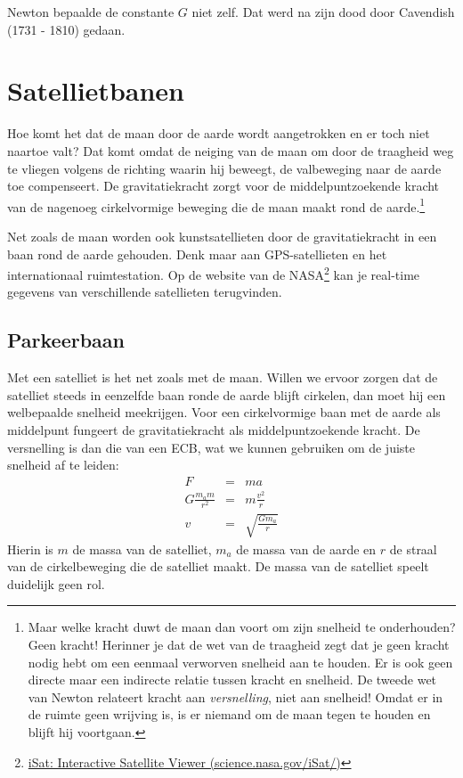 Newton bepaalde de constante $G$ niet zelf. Dat werd na zijn dood door Cavendish (1731 - 1810) gedaan.

\newpage

\section{Satellietbanen}

Hoe komt het dat de maan door de aarde wordt aangetrokken en er toch niet naartoe valt? Dat komt omdat de neiging van de maan om door de traagheid weg te vliegen volgens de richting waarin hij beweegt, de valbeweging naar de aarde toe compenseert. De gravitatiekracht zorgt voor de middelpuntzoekende kracht van de nagenoeg cirkelvormige beweging die de maan maakt rond de aarde.\footnote{Maar welke kracht duwt de maan dan voort om zijn snelheid te onderhouden? Geen kracht! Herinner je dat de wet van de traagheid zegt dat je geen kracht nodig hebt om een eenmaal verworven snelheid aan te houden. Er is ook geen directe maar een indirecte relatie tussen kracht en snelheid. De tweede wet van Newton relateert kracht aan \textit{versnelling}, niet aan snelheid! Omdat er in de ruimte geen wrijving is, is er niemand om de maan tegen te houden en blijft hij voortgaan.}

Net zoals de maan worden ook kunstsatellieten door de gravitatiekracht in een baan rond de aarde gehouden. Denk maar aan GPS-satellieten en het internationaal ruimtestation. Op de website van de NASA\footnote{\href{http://science.nasa.gov/iSat/}{iSat: Interactive Satellite Viewer (science.nasa.gov/iSat/)}} kan je real-time gegevens van verschillende satellieten terugvinden.

\subsection{Parkeerbaan}

Met een satelliet is het net zoals met de maan. Willen we ervoor zorgen dat de satelliet steeds in eenzelfde baan ronde de aarde blijft cirkelen, dan moet hij een welbepaalde snelheid meekrijgen. Voor een cirkelvormige baan met de aarde als middelpunt fungeert de gravitatiekracht als middelpuntzoekende kracht. De versnelling is dan die van een ECB, wat we kunnen gebruiken om de juiste snelheid af te leiden:
\begin{eqnarray*}
F&=&ma\\
G\frac{m_am}{r^2}&=&m\frac{v^2}{r}\\
v&=&\sqrt{\frac{Gm_a}{r}}
\end{eqnarray*}
Hierin is $m$ de massa van de satelliet, $m_a$ de massa van de aarde en $r$ de straal van de cirkelbeweging die de satelliet maakt. De massa van de satelliet speelt duidelijk geen rol. 

